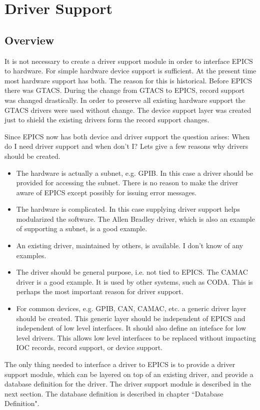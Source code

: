 \chapter{Driver Support}

\section{Overview}

It is not necessary to create a driver support module in order to interface EPICS to hardware. For simple hardware device 
support is sufficient. At the present time most hardware support has both. The reason for this is historical. Before EPICS 
there was GTACS. During the change from GTACS to EPICS, record support was changed drastically. In order to 
preserve all existing hardware support the GTACS drivers were used without change. The device support layer was 
created just to shield the existing drivers form the record support changes.

Since EPICS now has both device and driver support the question arises: When do I need driver support and when don't 
I? Lets give a few reasons why drivers should be created.

\begin{itemize}\item The hardware is actually a subnet, e.g. GPIB. In this case a driver should be provided for accessing the subnet. 
There is no reason to make the driver aware of EPICS except possibly for issuing error messages.

\item The hardware is complicated. In this case supplying driver support helps modularized the software. The Allen 
Bradley driver, which is also an example of supporting a subnet, is a good example.

\item An existing driver, maintained by others, is available. I don't know of any examples.

\item The driver should be general purpose, i.e. not tied to EPICS. The CAMAC driver is a good example. It is used by 
other systems, such as CODA. This is perhaps the most important reason for driver support.

\item For common devices, e.g. GPIB, CAN, CAMAC, etc. a generic driver layer should be created. This generic layer 
should be independent of EPICS and independent of low level interfaces. It should also define an inteface for low 
level drivers. This allows low level interfaces to be replaced without impacting IOC records, record support, or 
device support.

\end{itemize}The only thing needed to interface a driver to EPICS is to provide a driver support module, which can be layered on top of 
an existing driver, and provide a database definition for the driver. The driver support module is described in the next 
section. The database definition is described in chapter ``Database Definition".


